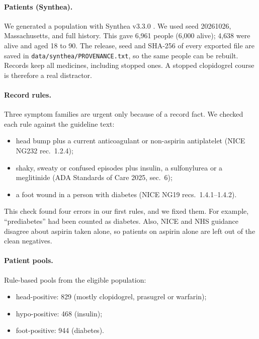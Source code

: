 \documentclass[10pt]{article}
\begin{document}
\paragraph{Patients (Synthea).} We generated a population with Synthea v3.3.0 \citep{walonoski2018synthea}. We used seed 20261026, Massachusetts, and full history. This gave 6{,}961 people (6{,}000 alive); 4{,}638 were alive and aged 18 to 90. The release, seed and SHA-256 of every exported file are saved in \texttt{data/synthea/PROVENANCE.txt}, so the same people can be rebuilt. Records keep all medicines, including stopped ones. A stopped clopidogrel course is therefore a real distractor.

\paragraph{Record rules.} Three symptom families are urgent only because of a record fact. We checked each rule against the guideline text:
\begin{itemize}
\item head bump plus a current anticoagulant or non-aspirin antiplatelet (NICE NG232 rec.\ 1.2.4);
\item shaky, sweaty or confused episodes plus insulin, a sulfonylurea or a meglitinide (ADA Standards of Care 2025, sec.\ 6);
\item a foot wound in a person with diabetes (NICE NG19 recs.\ 1.4.1--1.4.2).
\end{itemize}
This check found four errors in our first rules, and we fixed them. For example, ``prediabetes'' had been counted as diabetes. Also, NICE and NHS guidance disagree about aspirin taken alone, so patients on aspirin alone are left out of the clean negatives.

\paragraph{Patient pools.} Rule-based pools from the eligible population:
\begin{itemize}
\item head-positive: 829 (mostly clopidogrel, prasugrel or warfarin);
\item hypo-positive: 468 (insulin);
\item foot-positive: 944 (diabetes).
\end{itemize}
\end{document}
